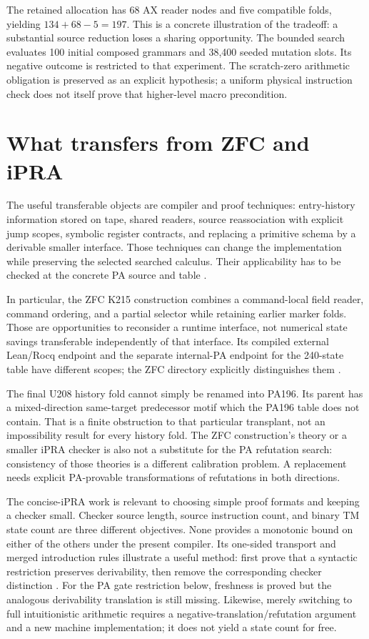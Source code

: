 \documentclass[11pt,letterpaper]{article}
\begin{document}
The retained allocation has 68 AX reader nodes and five compatible
folds, yielding $134+68-5=197$. This is a concrete illustration of the
tradeoff: a substantial source reduction loses a sharing opportunity.
The bounded search evaluates 100 initial composed grammars and 38,400
seeded mutation slots. Its negative outcome is restricted to that
experiment. The scratch-zero arithmetic obligation is preserved as an
explicit hypothesis; a uniform physical instruction check does not itself
prove that higher-level macro precondition.



\section{What transfers from ZFC and iPRA}

The useful transferable objects are compiler and proof techniques:
entry-history information stored on tape, shared readers, source
reassociation with explicit jump scopes, symbolic register contracts,
and replacing a primitive schema by a derivable smaller interface.
Those techniques can change the implementation while preserving the
selected searched calculus. Their applicability has to be checked at
the concrete PA source and table \cite{zfc}.

In particular, the ZFC K215 construction combines a command-local field
reader, command ordering, and a partial selector while retaining earlier
marker folds. Those are opportunities to reconsider a runtime interface,
not numerical state savings transferable independently of that interface.
Its compiled external Lean/Rocq endpoint and the separate internal-PA
endpoint for the 240-state table have different scopes; the ZFC directory
explicitly distinguishes them \cite{zfc}.

The final U208 history fold cannot simply be renamed into PA196.
Its parent has a mixed-direction same-target predecessor motif which
the PA196 table does not contain. That is a finite obstruction to that
particular transplant, not an impossibility result for every history
fold. The ZFC construction's theory or a smaller iPRA checker is also not
a substitute for the PA refutation search: consistency of those theories
is a different calibration problem. A replacement needs explicit
PA-provable transformations of refutations in both directions.

The concise-iPRA work is relevant to choosing simple proof formats and
keeping a checker small. Checker source length, source instruction count,
and binary TM state count are three different objectives. None provides
a monotonic bound on either of the others under the present compiler.
Its one-sided transport and merged introduction rules illustrate a useful
method: first prove that a syntactic restriction preserves derivability,
then remove the corresponding checker distinction \cite{ipra}.
For the PA gate restriction below, freshness is proved but the analogous
derivability translation is still missing.
Likewise, merely switching to full intuitionistic arithmetic requires
a negative-translation/refutation argument and a new machine
implementation; it does not yield a state count for free.
\end{document}
